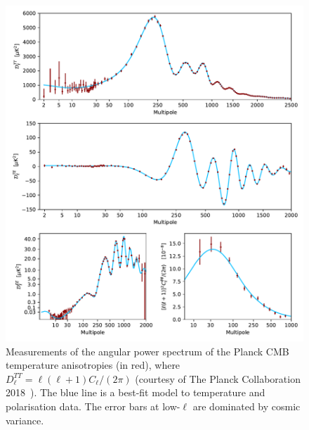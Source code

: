 \begin{figure}[htpb]
	\centering\capstart{}
	\includegraphics[trim={0 430 0 0},clip,width=\textwidth]{planck_2018_power_spectrum.pdf}
	\caption[
        The 2018 Planck CMB angular power spectrum in temperature
	]{
        Measurements of the angular power spectrum of the Planck CMB temperature anisotropies (in red), where \(D_{\ell}^{TT} = \ell(\ell+1)C_{\ell}/(2\pi)\) (courtesy of The Planck Collaboration 2018~\cite{Planck2020}).
        The blue line is a best-fit model to temperature and polarisation data.
        The error bars at low-\(\ell{}\) are dominated by cosmic variance.
	}\label{fig:chapter2_power_spectrum}
\end{figure}

